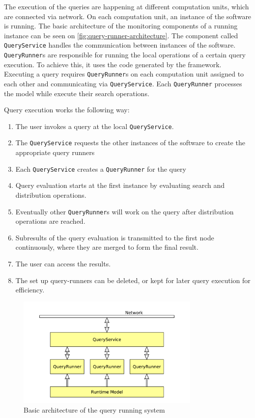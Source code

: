 The execution of the queries are happening at different computation units, which are connected via network.
On each computation unit, an instance of the software is running.
The basic architecture of the monitoring components of a running instance can be seen on \autoref{fig:query-runner-architecture}.
The component called \texttt{QueryService} handles the communication between instances of the software.
\texttt{QueryRunner}s are responsible for running the local operations of a certain query execution. 
To achieve this, it uses the code generated by the framework.
Executing a query requires \texttt{QueryRunner}s on each computation unit assigned to each other and communicating via \texttt{QueryService}. 
Each \texttt{QueryRunner} processes the model while execute their search operations.

Query execution works the following way:
\begin{enumerate}
\item The user invokes a query at the local \texttt{QueryService}.
\item The \texttt{QueryService} requests the other instances of the software to create the appropriate query runners
\item Each \texttt{QueryService} creates a \texttt{QueryRunner} for the query
\item Query evaluation starts at the first instance by evaluating search and distribution operations.
\item Eventually other \texttt{QueryRunner}s will work on the query after distribution operations are reached.
\item Subresults of the query evaluation is transmitted to the first node continuously, where they are merged to form the final result.
\item The user can access the results.
\item The set up query-runners can be deleted, or kept for later query execution for efficiency.
\end{enumerate}


\begin{figure}[H]
	\begin{center}
		\includegraphics[width=0.8\textwidth]{figures/query-runner-architecture.pdf}
		\caption{ Basic architecture of the query running system }
		\label{fig:query-runner-architecture}
	\end{center}
\end{figure}









